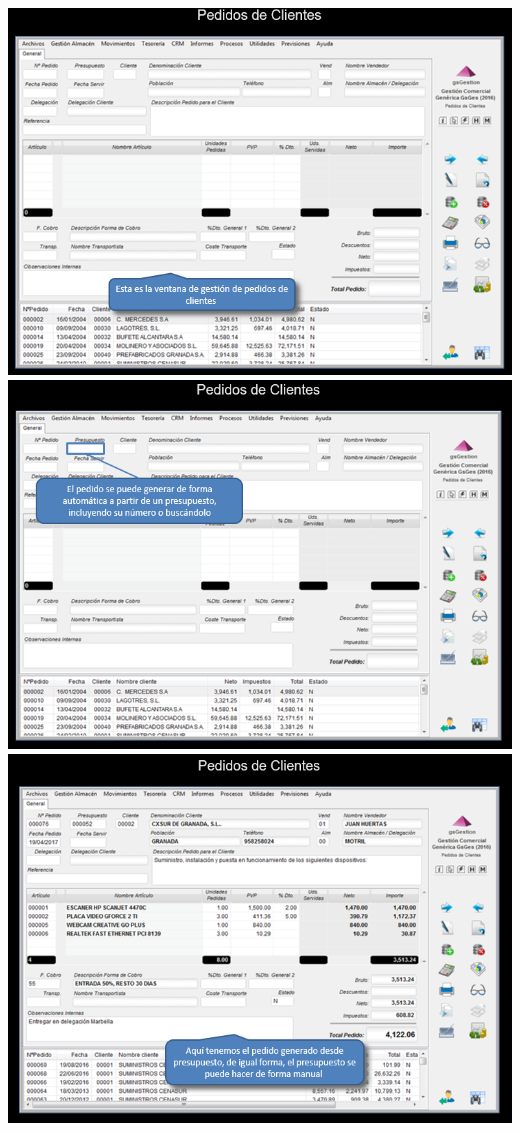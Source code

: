\documentclass{article}
\begin{document}
\begin{itemize}
\begin{flushleft}
	\includegraphics[scale=0.65]{imagenes/CapturasoftwareSaaS1j.png}
	\includegraphics[scale=0.65]{imagenes/CapturasoftwareSaaS1k.png}
	\includegraphics[scale=0.65]{imagenes/CapturasoftwareSaaS1l.png}

\end{flushleft}
\end{itemize}
\end{document}
